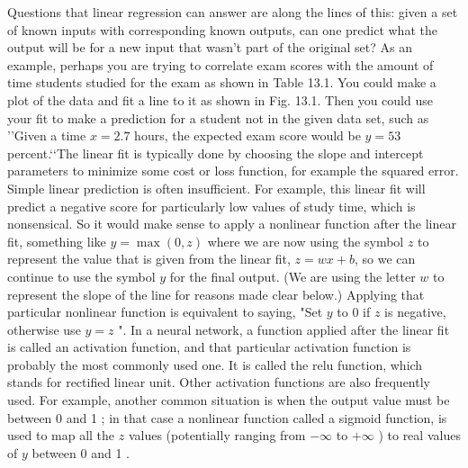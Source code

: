 Questions that linear regression can answer are along the lines of this: given a set of known inputs with corresponding known outputs, can one predict what the output will be for a new input that wasn't part of the original set? As an example, perhaps you are trying to correlate exam scores with the amount of time students studied for the exam as shown in Table 13.1.
You could make a plot of the data and fit a line to it as shown in Fig. 13.1. Then you could use your fit to make a prediction for a student not in the given data set, such as \rq\rq Given a time $x=2.7$ hours, the expected exam score would be $y=53$ percent.\lq\lq The linear fit is typically done by choosing the slope and intercept parameters to minimize some cost or loss function, for example the squared error.\\

Simple linear prediction is often insufficient. For example, this linear fit will predict a negative score for particularly low values of study time, which is nonsensical. So it would make sense to apply a nonlinear function after the linear fit, something like $y=\max (0, z)$ where we are now using the symbol $z$ to represent the value that is given from the linear fit, $z=w x+b$, so we can continue to use the symbol $y$ for the final output. (We are using the letter $w$ to represent the slope of the line for reasons made clear below.) Applying that particular nonlinear function is equivalent to saying, "Set $y$ to 0 if $z$ is negative, otherwise use $y=z$ ".
In a neural network, a function applied after the linear fit is called an activation function, and that particular activation function is probably the most commonly used one. It is called the relu function, which stands for rectified linear unit. Other activation functions are also frequently used. For example, another common situation is when the output value must be between 0 and 1 ; in that case a nonlinear function called a sigmoid function, is used to map all the $z$ values (potentially ranging from $-\infty$ to $+\infty$ ) to real values of $y$ between 0 and 1 .

